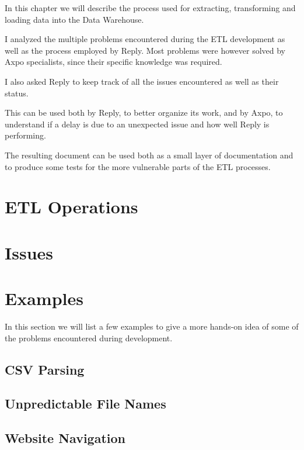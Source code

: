 \label{section:etl}
In this chapter we will describe the process used for extracting, transforming and loading data into the Data Warehouse.

I analyzed the multiple problems encountered during the ETL development as well as the process employed by Reply.
Most problems were however solved by Axpo specialists, since their specific knowledge was required.

I also asked Reply to keep track of all the issues encountered as well as their status.

This can be used both by Reply, to better organize its work, and by Axpo, to understand if a delay is due to an unexpected issue and how well Reply is performing.

The resulting document can be used both as a small layer of documentation and to produce some tests for the more vulnerable parts of the ETL processes.

\section{ETL Operations}
    
    
\section{Issues} \label{section:etl:difficulties}
    

\section{Examples}
    In this section we will list a few examples to give a more hands-on idea of some of the problems encountered during development.
    
    \subsection{CSV Parsing}
        
    \subsection{Unpredictable File Names} \label{section:etl:terna}
        
    \subsection{Website Navigation}
        
    